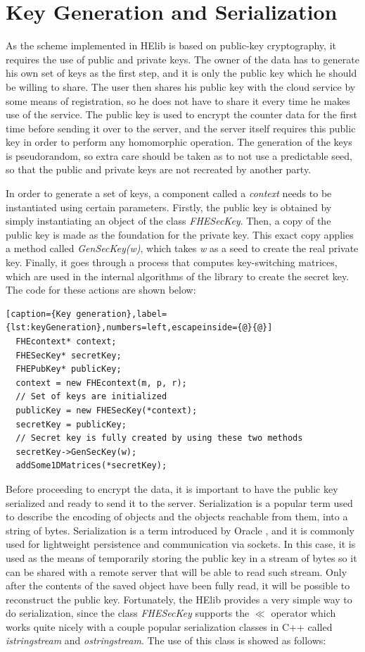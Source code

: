 \section{{Key Generation and Serialization}}

As the scheme implemented in HElib is based on public-key cryptography, it requires the use of public and private keys. The owner of the data has to generate his own set of keys as the first step, and it is only the public key which he should be willing to share. The user then shares his public key with the cloud service by some means of registration, so he does not have to share it every time he makes use of the service. The public key is used to encrypt the counter data for the first time before sending it over to the server, and the server itself requires this public key in order to perform any homomorphic operation.
The generation of the keys is pseudorandom, so extra care should be taken as to not use a predictable seed, so that the public and private keys are not recreated by another party. 

In order to generate a set of keys, a component called a \emph{context} needs to be instantiated using certain parameters. Firstly, the public key is obtained by simply instantiating an object of the class \textit{FHESecKey}. Then, a copy of the public key is made as the foundation for the private key. This exact copy applies a method called \textit{GenSecKey(w)}, which takes \textit{w} as a seed to create the real private key. Finally, it goes through a process that computes key-switching matrices, which are used in the internal algorithms of the library to create the secret key. The code for these actions are shown below:

\begin{lstlisting}[caption={Key generation},label={lst:keyGeneration},numbers=left,escapeinside={@}{@}]
  FHEcontext* context;
  FHESecKey* secretKey;
  FHEPubKey* publicKey;  
  context = new FHEcontext(m, p, r);
  // Set of keys are initialized
  publicKey = new FHESecKey(*context);
  secretKey = publicKey;
  // Secret key is fully created by using these two methods
  secretKey->GenSecKey(w); 
  addSome1DMatrices(*secretKey); 
\end{lstlisting}

Before proceeding to encrypt the data, it is important to have the public key serialized and ready to send it to the server. Serialization is a popular term used to describe the encoding of objects and the objects reachable from them, into a string of bytes. Serialization is a term introduced by Oracle \cite{oracleserial}, and it is commonly used for lightweight persistence and communication via sockets. In this case, it is used as the means of temporarily storing the public key in a stream of bytes so it can be shared with a remote server that will be able to read such stream. Only after the contents of the saved object have been fully read, it will be possible to reconstruct the public key. Fortunately, the HElib provides a very simple way to do serialization, since the class \textit{FHESecKey} supports the $\ll$ operator which works quite nicely with a couple popular serialization classes in C++ called \textit{istringstream} and \textit{ostringstream}. The use of this class is showed as follows: 

